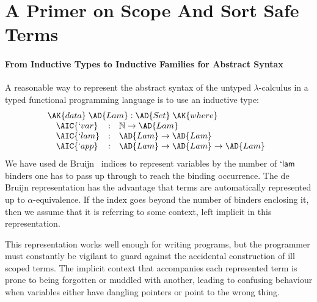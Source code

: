 

\section{A Primer on Scope And Sort Safe Terms}\label{section:primer-term}

\paragraph{From Inductive Types to Inductive Families for Abstract
  Syntax} A reasonable way to represent the abstract syntax of the
untyped $\lambda$-calculus in a typed functional programming language
is to use an inductive type:
\begin{displaymath}
  \begin{array}{l}
    \AK{data}\;\AD{Lam} : \AD{Set}\;\AK{where} \\
    \quad\begin{array}{@{}lll}
           \AIC{`var} &:& \mathbb{N} \to \AD{Lam} \\
           \AIC{`lam} &:& \AD{Lam} \to \AD{Lam} \\
           \AIC{`app} &:& \AD{Lam} \to \AD{Lam} \to \AD{Lam}
    \end{array}
  \end{array}
\end{displaymath}
We have used de Bruijn~\citeyear{de1972lambda} indices to represent
variables by the number of $\mathsf{`lam}$ binders one has to pass up
through to reach the binding occurrence. The de Bruijn representation
has the advantage that terms are automatically represented up to
$\alpha$-equivalence. If the index goes beyond the number of binders
enclosing it, then we assume that it is referring to some context,
left implicit in this representation.

This representation works well enough for writing programs, but the
programmer must constantly be vigilant to guard against the accidental
construction of ill scoped terms. The implicit context that
accompanies each represented term is prone to being forgotten or
muddled with another, leading to confusing behaviour when variables
either have dangling pointers or point to the wrong thing.

